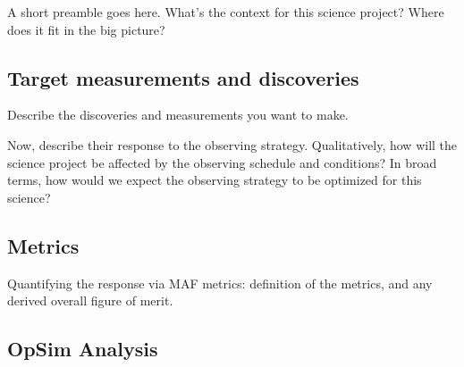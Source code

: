 

A short preamble goes here. What's the context for this science
project? Where does it fit in the big picture?


\subsection{Target measurements and discoveries}
\label{sec:\secname:targets}

Describe the discoveries and measurements you want to make.

Now, describe their response to the observing strategy. Qualitatively,
how will the science project be affected by the observing schedule and
conditions? In broad terms, how would we expect the observing strategy
to be optimized for this science?



\subsection{Metrics}
\label{sec:\secname:metrics}

Quantifying the response via MAF metrics: definition of the metrics,
and any derived overall figure of merit.



\subsection{OpSim Analysis}
\label{sec:\secname:analysis}

